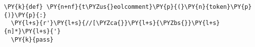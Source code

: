 \begin{Verbatim}[commandchars=\\\{\}]
\PY{k}{def} \PY{n+nf}{t\PYZus{}eolcomment}\PY{p}{(}\PY{n}{token}\PY{p}{)}\PY{p}{:}
  \PY{l+s}{r'}\PY{l+s}{//[\PYZca{}}\PY{l+s}{\PYZbs{}}\PY{l+s}{n]*}\PY{l+s}{'}
  \PY{k}{pass}
\end{Verbatim}
